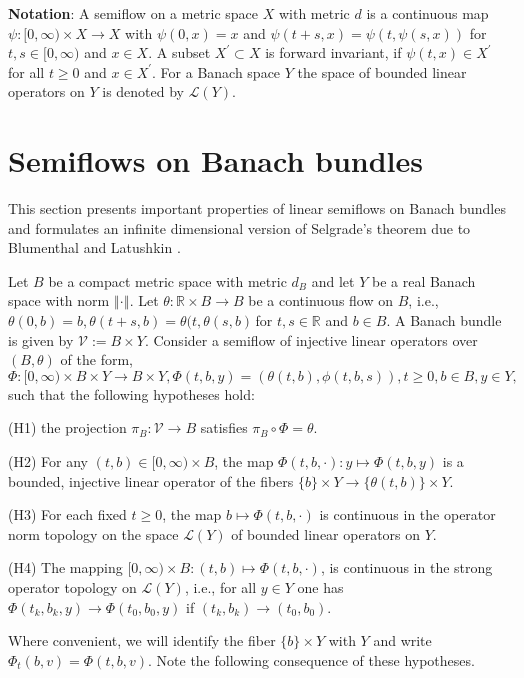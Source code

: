 \documentclass{siamltex}%
\begin{document}
\textbf{Notation}: A semiflow on a metric space $X$ with metric $d$ is a
continuous map $\psi:[0,\infty)\times X\rightarrow X$ with $\psi(0,x)=x$ and
$\psi(t+s,x)=\psi(t,\psi(s,x))$ for $t,s\in\lbrack0,\infty)$ and $x\in X$. A
subset $X^{\prime}\subset X$ is forward invariant, if $\psi(t,x)\in X^{\prime
}$ for all $t\geq0$ and $x\in X^{\prime}$. For a Banach space $Y$ the space of
bounded linear operators on $Y$ is denoted by $\mathcal{L}(Y)$.

\section{Semiflows on Banach bundles\label{Section2}}

This section presents important properties of linear semiflows on Banach
bundles and formulates an infinite dimensional version of Selgrade's theorem
due to Blumenthal and Latushkin \cite{BluL19}.

Let $B$ be a compact metric space with metric $d_{B}$ and let $Y$ be a real
Banach space with norm $\left\Vert \cdot\right\Vert $. Let $\theta
:\mathbb{R}\times B\rightarrow B$ be a continuous flow on $B$, i.e.,
$\theta(0,b)=b,\theta(t+s,b)=\theta(t,\theta(s,b)\,$for $t,s\in\mathbb{R}$ and
$b\in B$. A Banach bundle is given by $\mathcal{V}:=B\times Y$. Consider a
semiflow of injective linear operators over $(B,\theta)$ of the form,%
\[
\Phi:[0,\infty)\times B\times Y\rightarrow B\times Y,\Phi(t,b,y)=(\theta
(t,b),\phi(t,b,s)),t\geq0,b\in B,y\in Y,
\]
such that the following hypotheses hold:

(H1) the projection $\pi_{B}:\mathcal{V}\rightarrow B$ satisfies $\pi_{B}%
\circ\Phi=\theta$.

(H2) For any $(t,b)\in\lbrack0,\infty)\times B$, the map $\Phi(t,b,\cdot
):y\mapsto\Phi(t,b,y)$ is a bounded, injective linear operator of the fibers
$\{b\}\times Y\rightarrow\{\theta(t,b)\}\times Y$.

(H3) For each fixed $t\geq0$, the map $b\mapsto\Phi(t,b,\cdot)$ is continuous
in the operator norm topology on the space $\mathcal{L}(Y)$ of bounded linear
operators on $Y$.

(H4) The mapping $[0,\infty)\times B:(t,b)\mapsto\Phi(t,b,\cdot)$, is
continuous in the strong operator topology on $\mathcal{L}(Y)$, i.e., for all
$y\in Y$ one has $\Phi(t_{k},b_{k},y)\rightarrow\Phi(t_{0},b_{0},y)$ if
$(t_{k},b_{k})\rightarrow(t_{0},b_{0})$.

Where convenient, we will identify the fiber $\{b\}\times Y$ with $Y$ and
write $\Phi_{t}(b,v)=\Phi(t,b,v)$. Note the following consequence of these hypotheses.
\end{document}
